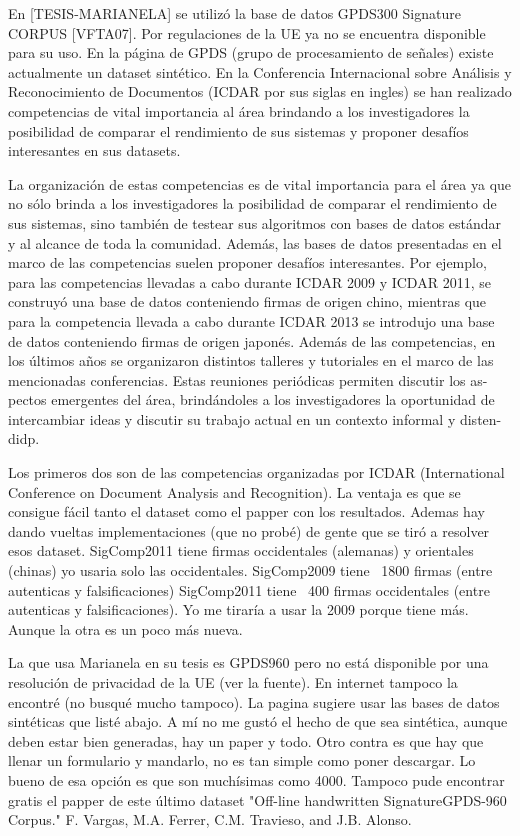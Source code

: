 En [TESIS-MARIANELA] se utilizó la base de datos GPDS300 Signature CORPUS [VFTA07]. Por regulaciones de la UE ya no se encuentra disponible para su uso. En la página de GPDS (grupo de procesamiento de señales) existe actualmente un dataset sintético.
En la Conferencia Internacional sobre Análisis y Reconocimiento de Documentos (ICDAR por sus siglas en ingles) se han realizado competencias de vital importancia al área brindando a los investigadores la posibilidad de comparar el rendimiento de sus sistemas y proponer desafíos interesantes en sus datasets. 



La organización de estas competencias es de vital importancia para el área ya que
no sólo brinda a los investigadores la posibilidad de comparar el rendimiento de
sus sistemas, sino también de testear sus algoritmos con bases de datos estándar
y al alcance de toda la comunidad.
Además, las bases de datos presentadas en
el marco de las competencias suelen proponer desafíos interesantes. Por ejemplo,
para las competencias llevadas a cabo durante ICDAR 2009 y ICDAR 2011, se
construyó una base de datos conteniendo firmas de origen chino, mientras que
para la competencia llevada a cabo durante ICDAR 2013 se introdujo una base
de datos conteniendo firmas de origen japonés. Además de las competencias, en
los últimos años se organizaron distintos talleres y tutoriales en el marco de las
mencionadas conferencias. Estas reuniones periódicas permiten discutir los as-
pectos emergentes del área, brindándoles a los investigadores la oportunidad de
intercambiar ideas y discutir su trabajo actual en un contexto informal y disten-
didp.

Los primeros dos son de las competencias organizadas por ICDAR (International Conference on Document Analysis and Recognition).
La ventaja es que se consigue fácil tanto el dataset como el papper con los resultados. Ademas hay dando vueltas implementaciones (que no probé) de gente que se tiró a resolver esos dataset.
SigComp2011 tiene firmas occidentales (alemanas) y orientales (chinas) yo usaria solo las occidentales.
SigComp2009 tiene ~1800 firmas (entre autenticas y falsificaciones)
SigComp2011 tiene ~400 firmas occidentales (entre autenticas y falsificaciones).
Yo me tiraría a usar la 2009 porque tiene más. Aunque la otra es un poco más nueva.

La que usa Marianela en su tesis es GPDS960 pero no está disponible por una resolución de privacidad de la UE (ver la fuente). En internet tampoco la encontré (no busqué mucho tampoco).
La pagina sugiere usar las bases de datos sintéticas que listé abajo. A mí no me gustó el hecho de que sea sintética, aunque deben estar bien generadas, hay un paper y todo. Otro contra es que hay que llenar un formulario y mandarlo, no es tan simple como poner descargar. Lo bueno de esa opción es que son muchísimas como 4000.
Tampoco pude encontrar gratis el papper de este último dataset "Off-line handwritten SignatureGPDS-960 Corpus." F. Vargas, M.A. Ferrer, C.M. Travieso, and J.B. Alonso.


